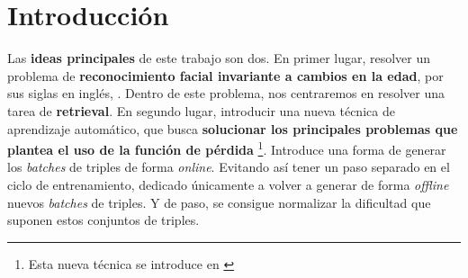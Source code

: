 
\chapter{Introducción} \label{ich:introduccion}




Las \textbf{ideas principales} de este trabajo son dos. En primer lugar, resolver un problema de \textbf{reconocimiento facial invariante a cambios en la edad}, por sus siglas en inglés, . Dentro de este problema, nos centraremos en resolver una tarea de \textbf{retrieval}. En segundo lugar, introducir una nueva técnica de aprendizaje automático, que busca \textbf{solucionar los principales problemas que plantea el uso de la función de pérdida } \footnote{Esta nueva técnica se introduce en \cite{matematicas:principal}}. Introduce una forma de generar los \textit{batches} de triples de forma \textit{online}. Evitando así tener un paso separado en el ciclo de entrenamiento, dedicado únicamente a volver a generar de forma \textit{offline} nuevos \textit{batches} de triples. Y de paso, se consigue normalizar la dificultad que suponen estos conjuntos de triples.

